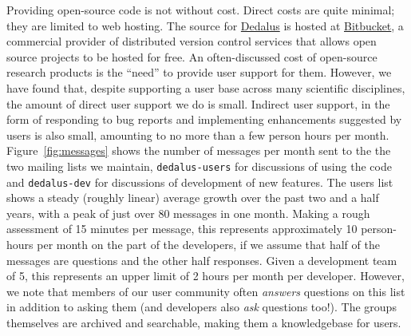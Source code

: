 \documentclass[12pt, preprint]{aastex}
\newcommand{\dedalus}{\href{http://dedalus-project.org}{Dedalus}}
\begin{document}

Providing open-source code is not without cost. Direct costs are quite minimal; they are limited to web hosting. The source for \dedalus{} is hosted at \href{https://bitbucket.org}{Bitbucket}, a commercial provider of distributed version control services that allows open source projects to be hosted for free. An often-discussed cost of open-source research products is the ``need'' to provide user support for them. However, we have found that, despite supporting a user base across many scientific disciplines, the amount of direct user support we do is small. Indirect user support, in the form of responding to bug reports and implementing enhancements suggested by users is also small, amounting to no more than a few person hours per month. Figure~\ref{fig:messages} shows the number of messages per month sent to the the two mailing lists we maintain, \texttt{dedalus-users} for discussions of using the code and \texttt{dedalus-dev} for discussions of development of new features. The users list shows a steady (roughly linear) average growth over the past two and a half years, with a peak of just over 80 messages in one month. Making a rough assessment of 15 minutes per message, this represents approximately 10 person-hours per month on the part of the developers, if we assume that half of the messages are questions and the other half responses. Given a development team of 5, this represents an upper limit of 2 hours per month per developer. However, we note that members of our user community often \emph{answers} questions on this list in addition to asking them (and developers also \emph{ask} questions too!). The groups themselves are archived and searchable, making them a knowledgebase for users. 
\end{document}
